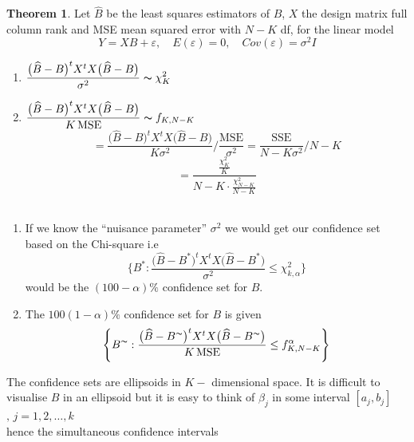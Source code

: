 \documentclass[11pt,a4paper]{article}
\theoremstyle{definition}
\newtheorem{thm}{Theorem}[subsection]
\begin{document}
\begin{thm}\label{res:thm:2.4.1}
Let $\widehat{B}$ be the least squares estimators of $B$, $X$ the design matrix full column rank and MSE mean squared error with $N-K$ df, for the linear model $$Y=XB+\varepsilon,\quad  E(\varepsilon)=0,\quad  Cov(\varepsilon)=\sigma^2I$$

\begin{enumerate}
\item[i).] $\displaystyle{ \frac{\big(\widehat{B}-B\big)^tX^tX\big(\widehat{B}-B\big)}{\sigma^2}\thicksim \chi^2_K}$\\

\item[ii).] $\displaystyle{\frac{\big(\widehat{B}-B\big)^tX^tX\big(\widehat{B}-B\big)}{K\,\text{MSE}}\thicksim f_{K,N-K}}$\\

$$=\frac{\big(\hat{B}-B\big)^tX^tX\big(\hat{B}-B\big)}{K\sigma^2}\Bigg/\frac{\text{MSE}}{\sigma^2}=\frac{\text{SSE}}{N-K\sigma^2}\bigg/N-K$$
$$=\frac{\frac{\chi^2_K}{K}}{N-K\cdot\frac{\chi^2_{N-K}}{N-K}}$$\\
\end{enumerate}
 
 
 
 
\begin{enumerate}
\item[\textbf{Remark 1:}]
 If we know the ``nuisance parameter'' $\sigma^2$ we would get our confidence set based on the Chi-square i.e $$\Bigg\{B^*:\frac{\big(\widehat{B}-B^*\big)^tX^tX\big(\widehat{B}-B^*\big)}{\sigma^2}\leq \chi^2_{k,\alpha}\Bigg\}$$ would be the $(100-\alpha)\%$ confidence set for $B$.
 
 
\item[\textbf{Remark 2:}]
 The $100(1-\alpha)\%$ confidence set for $B$ is given $$\Bigg\{B^{\thicksim}:\frac{\big(\widehat{B}-B^{\thicksim}\big)^tX^tX\big(\widehat{B}-B^{\thicksim}\big)}{K\,\text{MSE}}\leq f^{\alpha}_{K,N-K}\Bigg\}$$
\end{enumerate}
The confidence sets are ellipsoids in $K-$ dimensional space. It is difficult to visualise $B$ in an ellipsoid but it is easy to think of $\beta_j$ in some interval $[a_j,b_j]$ $,\, j=1,2,\ldots ,k$\\

hence the simultaneous confidence intervals\\

\begin{figure}[H]
\centering
{}
\end{figure}



\end{thm}
\end{document}

